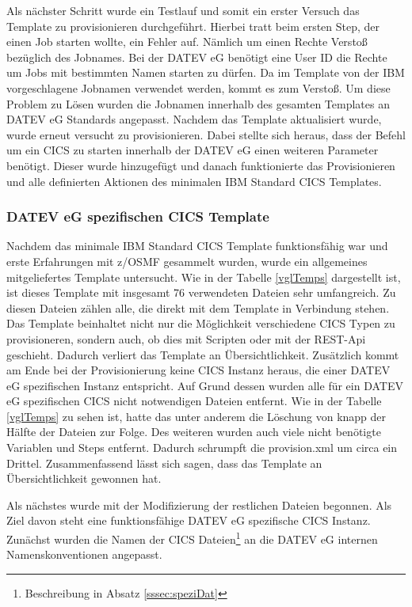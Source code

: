 Als nächster Schritt wurde ein Testlauf und somit ein erster Versuch das Template zu provisionieren durchgeführt.
Hierbei tratt beim ersten Step, der einen Job starten wollte, ein Fehler auf.
Nämlich um einen Rechte Verstoß bezüglich des Jobnames.
Bei der DATEV eG benötigt eine User ID die Rechte um Jobs mit bestimmten Namen starten zu dürfen.
Da im Template von der IBM vorgeschlagene Jobnamen verwendet werden, kommt es zum Verstoß.
Um diese Problem zu Lösen wurden die Jobnamen innerhalb des gesamten Templates an DATEV eG Standards angepasst.
Nachdem das Template aktualisiert wurde, wurde erneut versucht zu provisionieren.
Dabei stellte sich heraus, dass der Befehl um ein CICS zu starten innerhalb der DATEV eG einen weiteren Parameter benötigt.
Dieser wurde hinzugefügt und danach funktionierte das Provisionieren und alle definierten Aktionen des minimalen IBM Standard CICS Templates.

\subsubsection{DATEV eG spezifischen CICS Template}
Nachdem das minimale IBM Standard CICS Template funktionsfähig war und erste Erfahrungen mit z/OSMF gesammelt wurden, wurde ein allgemeines mitgeliefertes Template untersucht.
Wie in der Tabelle \ref{vglTemps} dargestellt ist, ist dieses Template mit insgesamt 76 verwendeten Dateien sehr umfangreich.
Zu diesen Dateien zählen alle, die direkt mit dem Template in Verbindung stehen.
Das Template beinhaltet nicht nur die Möglichkeit verschiedene CICS Typen zu provisioneren, sondern auch, ob dies mit Scripten oder mit der REST-Api geschieht.
Dadurch verliert das Template an Übersichtlichkeit.
Zusätzlich kommt am Ende bei der Provisionierung keine CICS Instanz heraus, die einer DATEV eG spezifischen Instanz entspricht.
Auf Grund dessen wurden alle für ein DATEV eG spezifischen CICS nicht notwendigen Dateien entfernt.
Wie in der Tabelle \ref{vglTemps} zu sehen ist, hatte das unter anderem die Löschung von knapp der Hälfte der Dateien zur Folge.
Des weiteren wurden auch viele nicht benötigte Variablen und Steps entfernt.
Dadurch schrumpft die provision.xml um circa ein Drittel.
Zusammenfassend lässt sich sagen, dass das Template an Übersichtlichkeit gewonnen hat.

Als nächstes wurde mit der Modifizierung der restlichen Dateien begonnen.
Als Ziel davon steht eine funktionsfähige DATEV eG spezifische CICS Instanz.
Zunächst wurden die Namen der CICS Dateien\footnote{Beschreibung in Absatz \ref{sssec:speziDat}} an die DATEV eG internen Namenskonventionen angepasst.


